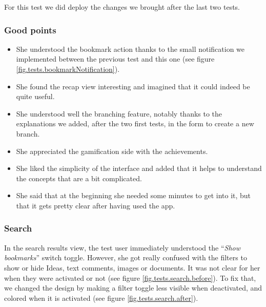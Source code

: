 \documentclass[a4paper,12pt,twoside]{article}
\begin{document}
For this test we did deploy the changes we brought after the last two tests.

\subsubsection*{Good points}
\begin{itemize}
    \item She understood the bookmark action thanks to the small notification we implemented between the previous test and this one (see figure \ref{fig.tests.bookmarkNotification}).
    \item She found the recap view interesting and imagined that it could indeed be quite useful.
    \item She understood well the branching feature, notably thanks to the explanations we added, after the two first tests, in the form to create a new branch.
    \item She appreciated the gamification side with the achievements.
    \item She liked the simplicity of the interface and added that it helps to understand the concepts that are a bit complicated.
    \item She said that at the beginning she needed some minutes to get into it, but that it gets pretty clear after having used the app.
\end{itemize}

\subsubsection*{Search}
In the search results view, the test user immediately understood the “\emph{Show bookmarks}” switch toggle.
However, she got really confused with the filters to show or hide Ideas, text comments, images or documents.
It was not clear for her when they were activated or not (see figure \ref{fig.tests.search.before}).
To fix that, we changed the design by making a filter toggle less visible when deactivated, and colored when it is activated (see figure \ref{fig.tests.search.after}).
\end{document}

